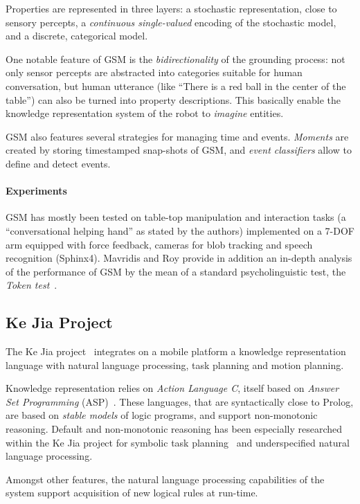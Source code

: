 \documentclass[a4paper, twocolumn]{article}
\begin{document}
Properties are represented in three layers: a stochastic representation, close
to sensory percepts, a \emph{continuous single-valued} encoding of the
stochastic model, and a discrete, categorical model.

One notable feature of GSM is the \emph{bidirectionality} of the grounding
process: not only sensor percepts are abstracted into categories suitable for
human conversation, but human utterance (like ``There is a red ball in the
center of the table'') can also be turned into property descriptions. This
basically enable the knowledge representation system of the robot to
\emph{imagine} entities.

GSM also features several strategies for managing time and events.
\emph{Moments} are created by storing timestamped snap-shots of GSM, and
\emph{event classifiers} allow to define and detect events.

\paragraph{Experiments} GSM has mostly been tested on table-top manipulation
and interaction tasks (a ``conversational helping hand'' as stated by the
authors) implemented on a 7-DOF arm equipped with force feedback, cameras for blob
tracking and speech recognition (Sphinx4). Mavridis and Roy provide in addition
an in-depth analysis of the performance of GSM by the mean of a standard
psycholinguistic test, the \emph{Token test}~\cite{DiSimoni1978}.

\subsection{Ke Jia Project}
\label{sect|kejia}

The Ke Jia project~\cite{Chen2010} integrates on a mobile platform a knowledge
representation language with natural language processing, task planning and
motion planning.

Knowledge representation relies on \emph{Action Language C}, itself based on
\emph{Answer Set Programming} (ASP)~\cite{Gelfond2008}. These languages, that
are syntactically close to Prolog, are based on \emph{stable models} of logic
programs, and support non-monotonic reasoning. Default and non-monotonic
reasoning has been especially researched within the Ke Jia project for symbolic
task planning~\cite{Ji2011} and underspecified natural language processing.

Amongst other features, the natural language processing capabilities of the
system support acquisition of new logical rules at run-time.
\end{document}
